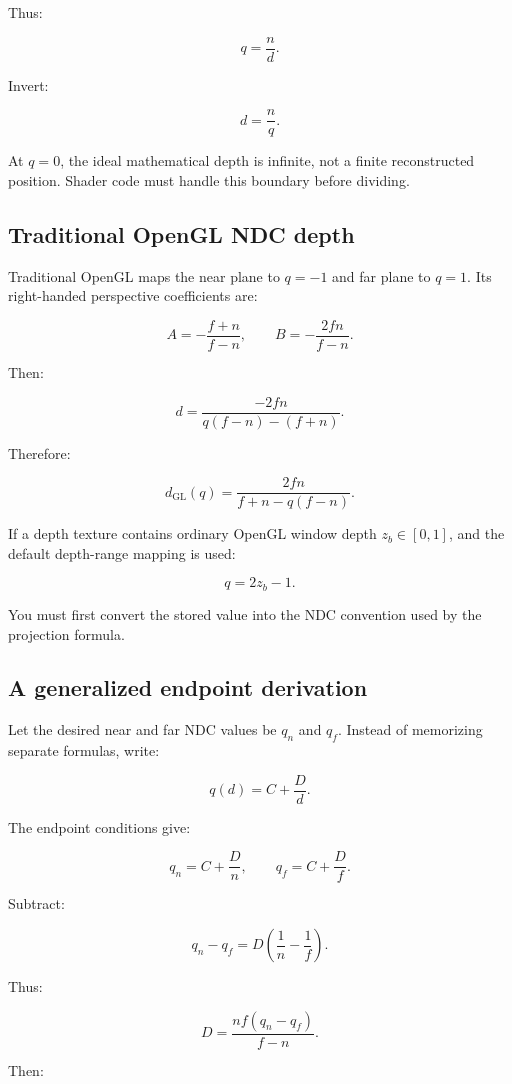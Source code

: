 Thus:

\[ q=\frac nd. \]

Invert:

\[ \boxed{ d=\frac nq. } \]

At \(q=0\), the ideal mathematical depth is infinite, not a finite reconstructed position. Shader code must handle this boundary before dividing.

\subsection{Traditional OpenGL NDC depth}\label{02-foundations-ii-ch035-traditional-opengl-ndc-depth}

Traditional OpenGL maps the near plane to \(q=-1\) and far plane to \(q=1\). Its right-handed perspective coefficients are:

\[ A=-\frac{f+n}{f-n}, \qquad B=-\frac{2fn}{f-n}. \]

Then:

\[ d= \frac{-2fn} {q(f-n)-(f+n)}. \]

Therefore:

\[ \boxed{ d_{\mathrm{GL}}(q)= \frac{2fn}{f+n-q(f-n)}. } \]

If a depth texture contains ordinary OpenGL window depth \(z_b\in[0,1]\), and the default depth-range mapping is used:

\[ q=2z_b-1. \]

You must first convert the stored value into the NDC convention used by the projection formula.

\subsection{A generalized endpoint derivation}\label{02-foundations-ii-ch035-a-generalized-endpoint-derivation}

Let the desired near and far NDC values be \(q_n\) and \(q_f\). Instead of memorizing separate formulas, write:

\[ q(d)=C+\frac Dd. \]

The endpoint conditions give:

\[ q_n=C+\frac Dn, \qquad q_f=C+\frac Df. \]

Subtract:

\[ q_n-q_f=D\left(\frac1n-\frac1f\right). \]

Thus:

\[ \boxed{ D=\frac{nf(q_n-q_f)}{f-n}. } \]

Then:


